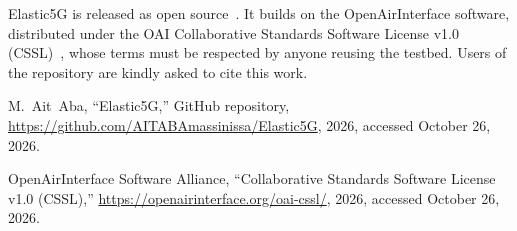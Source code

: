 
Elastic5G is released as open source~\cite{elastic5g}. It builds on the
OpenAirInterface software, distributed under the OAI Collaborative Standards
Software License v1.0 (CSSL)~\cite{oaicssl}, whose terms must be respected by
anyone reusing the testbed. Users of the repository are kindly asked to cite
this work.

M.~Ait~Aba, ``Elastic5G,'' GitHub repository,
\url{https://github.com/AITABAmassinissa/Elastic5G}, 2026, accessed
October 26, 2026.

OpenAirInterface Software Alliance, ``Collaborative Standards Software
License v1.0 (CSSL),'' \url{https://openairinterface.org/oai-cssl/}, 2026,
accessed October 26, 2026.

%

